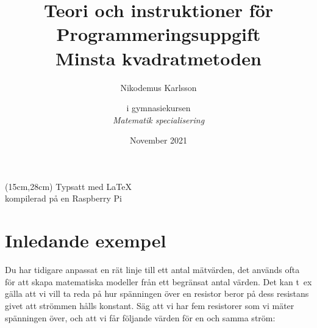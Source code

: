 \documentclass[titlepage, 10pt]{article}
\author{Nikodemus Karlsson}
\date{November 2021}
\begin{document}
\title{\large{Teori och instruktioner för}\\ \Huge{\textbf{Programmeringsuppgift}} \vspace{5mm}
\\\Large{Minsta kvadratmetoden}}
\begin{figure}
  \centering
\end{figure}
\begin{textblock*}{10cm}(15cm,28cm) %
   \small{Typsatt med \LaTeX\\kompilerad på en Raspberry Pi}
\end{textblock*}
\author{i gymnasiekursen\\\emph{Matematik specialisering}}
\maketitle
{}
\tableofcontents
\newpage
{}
\section{Inledande exempel}
Du har tidigare anpassat en rät linje till ett antal mätvärden, det används ofta
för att skapa matematiska modeller från ett begränsat antal värden. Det kan
\mbox{t ex} gälla att vi vill ta reda på hur spänningen över en resistor beror
på dess resistans givet att strömmen hålls konstant. Säg att vi har fem
resistorer som vi mäter spänningen över, och att vi får följande värden för en
och samma ström:
\end{document}
